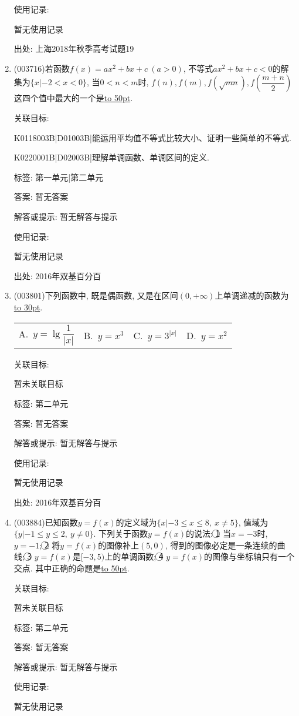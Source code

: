 \documentclass[10pt,a4paper]{article}
\newcommand{\blank}[1]{\underline{\hbox to #1pt{}}}
\newcommand{\fourch}[4]{\par\begin{tabular}{p{.23\textwidth}p{.23\textwidth}p{.23\textwidth}p{.23\textwidth}}
A.~#1 &B.~#2& C.~#3& D.~#4
\end{tabular}}
\begin{document}
\begin{enumerate}[1.]
使用记录:

暂无使用记录


出处: 上海2018年秋季高考试题19
\item { (003716)}若函数$f(x)=ax^2+bx+c\ (a>0)$, 不等式$ax^2+bx+c<0$的解集为$\{x|-2<x<0\}$, 当$0<n<m$时, $f(n),f(m),f(\sqrt{mn}),f\left(\dfrac{m+n}2\right)$这四个值中最大的一个是\blank{50}.


关联目标:

K0118003B|D01003B|能运用平均值不等式比较大小、证明一些简单的不等式.

K0220001B|D02003B|理解单调函数、单调区间的定义.



标签: 第一单元|第二单元

答案: 暂无答案

解答或提示: 暂无解答与提示

使用记录:

暂无使用记录


出处: 2016年双基百分百
\item { (003801)}下列函数中, 既是偶函数, 又是在区间$(0,+\infty)$上单调递减的函数为\blank{30}.
\fourch{$y=\lg\dfrac{1}{|x|}$}{$y=x^3$}{$y=3^{|x|}$}{$y=x^2$}


关联目标:

暂未关联目标



标签: 第二单元

答案: 暂无答案

解答或提示: 暂无解答与提示

使用记录:

暂无使用记录


出处: 2016年双基百分百
\item { (003884)}已知函数$y=f(x)$的定义域为$\{x|-3\le x\le 8, \ x\ne 5\}$, 值域为$\{y|-1\le y\le 2, \ y\ne 0\}$. 下列关于函数$y=f(x)$的说法: \textcircled{1} 当$x=-3$时, $y=-1$; \textcircled{2} 将$y=f(x)$的图像补上$(5,0)$, 得到的图像必定是一条连续的曲线; \textcircled{3} $y=f(x)$是$[-3,5)$上的单调函数; \textcircled{4} $y=f(x)$的图像与坐标轴只有一个交点. 其中正确的命题是\blank{50}.


关联目标:

暂未关联目标



标签: 第二单元

答案: 暂无答案

解答或提示: 暂无解答与提示

使用记录:

暂无使用记录



\end{enumerate}
\end{document}
